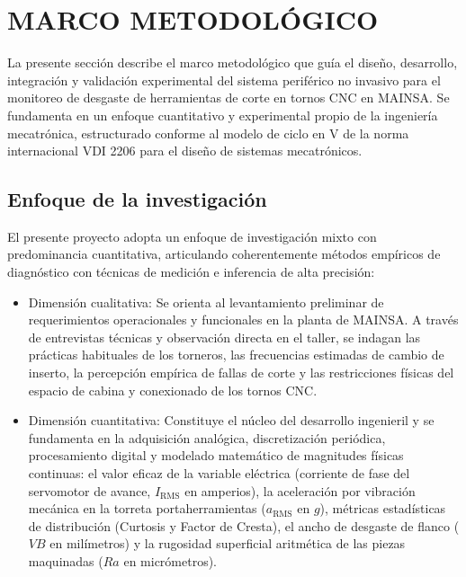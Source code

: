 
\newpage
\section{MARCO METODOLÓGICO}
\label{sec:marco_metodologico}


La presente sección describe el marco metodológico que guía el diseño, desarrollo, integración y validación experimental del sistema periférico no invasivo para el monitoreo de desgaste de herramientas de corte en tornos CNC en MAINSA. Se fundamenta en un enfoque cuantitativo y experimental propio de la ingeniería mecatrónica, estructurado conforme al modelo de ciclo en V de la norma internacional VDI 2206 para el diseño de sistemas mecatrónicos.

\subsection{Enfoque de la investigación}
El presente proyecto adopta un enfoque de investigación mixto con predominancia cuantitativa, articulando coherentemente métodos empíricos de diagnóstico con técnicas de medición e inferencia de alta precisión:
\begin{itemize}
    \item Dimensión cualitativa: Se orienta al levantamiento preliminar de requerimientos operacionales y funcionales en la planta de MAINSA. A través de entrevistas técnicas y observación directa en el taller, se indagan las prácticas habituales de los torneros, las frecuencias estimadas de cambio de inserto, la percepción empírica de fallas de corte y las restricciones físicas del espacio de cabina y conexionado de los tornos CNC.
    \item Dimensión cuantitativa: Constituye el núcleo del desarrollo ingenieril y se fundamenta en la adquisición analógica, discretización periódica, procesamiento digital y modelado matemático de magnitudes físicas continuas: el valor eficaz de la variable eléctrica (corriente de fase del servomotor de avance, $I_{\text{RMS}}$ en amperios), la aceleración por vibración mecánica en la torreta portaherramientas ($a_{\text{RMS}}$ en $g$), métricas estadísticas de distribución (Curtosis y Factor de Cresta), el ancho de desgaste de flanco ($VB$ en milímetros) y la rugosidad superficial aritmética de las piezas maquinadas ($Ra$ en micrómetros).
\end{itemize}

